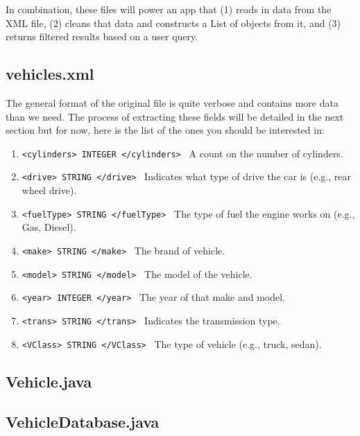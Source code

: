 \documentclass[a4paper]{article}
\begin{document}
In combination, these files will power an app that (1) reads in data from the
XML file, (2) cleans that data and constructs a List of objects from it, and
(3) returns filtered results based on a user query.


\subsection{vehicles.xml}\label{ref:xmlstuff}

The general format of the original file is quite verbose and contains more data
than we need. The process of extracting these fields will be detailed in the
next section but for now, here is the list of the ones you should be interested
in:
\begin{enumerate}
  \item \lstinline|<cylinders> INTEGER </cylinders>| \textrightarrow \ A count on the number of cylinders.
  \item \lstinline|<drive> STRING </drive>| \textrightarrow \ Indicates what type of drive the car is (e.g., rear wheel drive).
  \item \lstinline|<fuelType> STRING </fuelType>| \textrightarrow \ The type of fuel  the engine works on (e.g., Gas, Diesel).
  \item \lstinline|<make> STRING </make>| \textrightarrow \ The brand of vehicle.
  \item \lstinline|<model> STRING </model>| \textrightarrow \ The model of the vehicle.
  \item \lstinline|<year> INTEGER </year>| \textrightarrow \ The year of that make and model.
  \item \lstinline|<trans> STRING </trans>| \textrightarrow \ Indicates the transmission type.
  \item \lstinline|<VClass> STRING </VClass>| \textrightarrow \ The type of vehicle (e.g., truck, sedan).
\end{enumerate}

\newpage
\subsection{Vehicle.java}



\newpage
\subsection{VehicleDatabase.java}



\newpage
\end{document}
